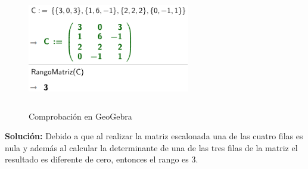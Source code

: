 \begin{figure}[ht!]
    \centering
    \includegraphics[width=200pt,height=150pt]{img/imagen12.png}
    \caption{Comprobación en GeoGebra}
\end{figure}

\textbf{Solución: }Debido a que al realizar la matriz escalonada una de las cuatro filas es nula y además al calcular la determinante de una de las tres filas de la matriz el resultado es diferente de cero, entonces el rango es 3.